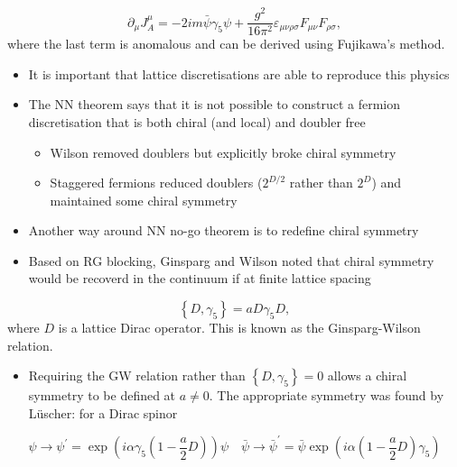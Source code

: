 \begin{equation}
\partial_{\mu} J_{A}^{\mu}=-2 i m \bar{\psi}{\gamma_{5}} \psi+\frac{g^{2}}{16 \pi^{2} }\varepsilon_{\mu \nu \rho \sigma} F_{\mu \nu} F_{\rho \sigma},
\end{equation}
where the last term is anomalous and can be derived using Fujikawa's method.

\begin{itemize}
  \item It is important that lattice discretisations are able to reproduce this physics
  \item The NN theorem says that it is not possible to construct a fermion discretisation that is both chiral (and local) and doubler free
  \begin{itemize}
      \item Wilson removed doublers but explicitly broke chiral symmetry
      \item Staggered fermions reduced doublers ($2^{D/2}$ rather than $2^D$) and maintained some chiral symmetry
  \end{itemize}
  \item Another way around NN no-go theorem is to redefine chiral symmetry
  \item Based on RG blocking, Ginsparg and Wilson noted that chiral symmetry would be recoverd in the continuum if at finite lattice spacing
\end{itemize}

\begin{equation}
\boxed{\left\{D, \gamma_{5}\right\}=a D \gamma_{5} D},
\end{equation}
where $D$ is a lattice Dirac operator. This is known as the Ginsparg-Wilson relation.

\begin{itemize}
  \item Requiring the GW relation rather than \(\left\{D, \gamma_{5}\right\}=0\) allows a chiral symmetry to be defined at \(a \neq 0\). The appropriate symmetry was found by L\"uscher: for a Dirac spinor
\end{itemize}

\begin{equation}
\boxed{\psi \rightarrow \psi^{\prime}=\exp \left(i \alpha \gamma_{5}\left(1-\frac{a}{2} D\right)\right) \psi \quad \bar{\psi} \rightarrow \bar{\psi}^{\prime}=\bar{\psi} \exp \left(i \alpha\left(1-\frac{a}{2} D\right) \gamma_{5}\right)}
\end{equation}

